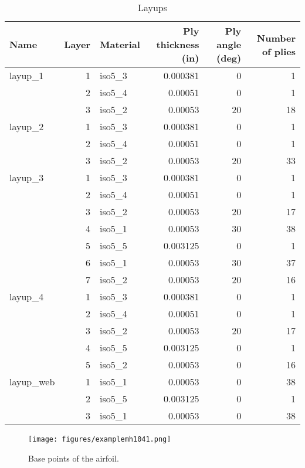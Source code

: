 \documentclass{book}
\begin{document}
\begin{table}[h]
  \centering
  \caption{Layups}
  \begin{tabular}{lrlrrr}
    \toprule
    Name & Layer & Material & Ply thickness (in) & Ply angle (deg) & Number of plies \\
    \midrule
    layup\_1   & 1  & iso5\_3   & 0.000381  & 0   & 1   \\
               & 2  & iso5\_4   & 0.00051   & 0   & 1   \\
               & 3  & iso5\_2   & 0.00053   & 20  & 18  \\
    layup\_2   & 1  & iso5\_3   & 0.000381  & 0   & 1   \\
               & 2  & iso5\_4   & 0.00051   & 0   & 1   \\
               & 3  & iso5\_2   & 0.00053   & 20  & 33  \\
    layup\_3   & 1  & iso5\_3   & 0.000381  & 0   & 1   \\
               & 2  & iso5\_4   & 0.00051   & 0   & 1   \\
               & 3  & iso5\_2   & 0.00053   & 20  & 17  \\
               & 4  & iso5\_1   & 0.00053   & 30  & 38  \\
               & 5  & iso5\_5   & 0.003125  & 0   & 1   \\
               & 6  & iso5\_1   & 0.00053   & 30  & 37  \\
               & 7  & iso5\_2   & 0.00053   & 20  & 16  \\
    layup\_4   & 1  & iso5\_3   & 0.000381  & 0   & 1   \\
               & 2  & iso5\_4   & 0.00051   & 0   & 1   \\
               & 3  & iso5\_2   & 0.00053   & 20  & 17  \\
               & 4  & iso5\_5   & 0.003125  & 0   & 1   \\
               & 5  & iso5\_2   & 0.00053   & 0   & 16  \\
    layup\_web & 1  & iso5\_1   & 0.00053   & 0   & 38  \\
               & 2  & iso5\_5   & 0.003125  & 0   & 1   \\
               & 3  & iso5\_1   & 0.00053   & 0   & 38  \\
    \bottomrule
  \end{tabular}
  \label{table:mh104_layups}
\end{table}

\begin{figure}[h]
  \centerline{\texttt{[image: figures/examplemh1041.png]}}
  \caption{Base points of the airfoil.}
  \label{fig:mh1041}
\end{figure}
\end{document}
